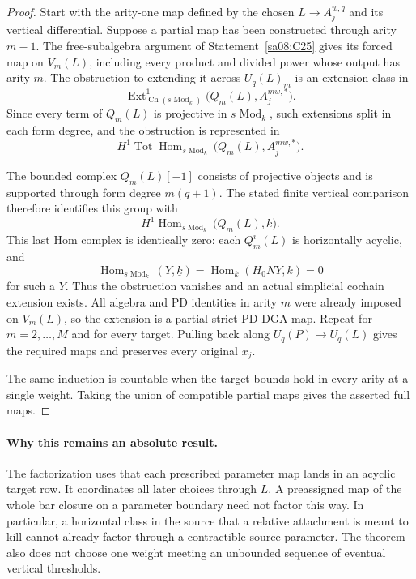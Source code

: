 \begin{proof}
Start with the arity-one map defined by the chosen
$L\to A_j^{w,q}$ and its vertical differential.
Suppose a partial map has been constructed through
arity $m-1$. The free-subalgebra argument of
Statement~\ref{sa08:C25} gives its forced map on
$V_m(L)$, including every product and divided power
whose output has arity $m$. The obstruction to extending
it across $U_q(L)_m$ is an extension class in
\[
 \operatorname{Ext}^1_{\operatorname{Ch}(s\operatorname{Mod}_k)}
       \bigl(Q_m(L),A_j^{mw,*}\bigr).
\]
Since every term of $Q_m(L)$ is projective in
$s\operatorname{Mod}_k$, such extensions split in
each form degree, and the obstruction is represented in
\[
 H^1\operatorname{Tot}\operatorname{Hom}_{s\operatorname{Mod}_k}
       \bigl(Q_m(L),A_j^{mw,*}\bigr).
\]

The bounded complex $Q_m(L)[-1]$ consists of projective
objects and is supported through form degree
$m(q+1)$. The stated finite vertical comparison therefore
identifies this group with
\[
 H^1\operatorname{Hom}_{s\operatorname{Mod}_k}
       \bigl(Q_m(L),\underline{k}\bigr).
\]
This last Hom complex is identically zero: each
$Q_m^i(L)$ is horizontally acyclic, and
\[
 \operatorname{Hom}_{s\operatorname{Mod}_k}
       (Y,\underline{k})
 =\operatorname{Hom}_k(H_0NY,k)=0
\]
for such a $Y$. Thus the obstruction vanishes and an
actual simplicial cochain extension exists. All algebra
and PD identities in arity $m$ were already imposed on
$V_m(L)$, so the extension is a partial strict PD-DGA
map. Repeat for $m=2,\ldots,M$ and for every target.
Pulling back along $U_q(P)\to U_q(L)$ gives the required
maps and preserves every original $x_j$.

The same induction is countable when the target bounds
hold in every arity at a single weight. Taking the union
of compatible partial maps gives the asserted full maps.
\end{proof}

\paragraph{Why this remains an absolute result.}
The factorization uses that each prescribed parameter map
lands in an acyclic target row. It coordinates all later
choices through $L$. A preassigned map of the whole bar
closure on a parameter boundary need not factor this way.
In particular, a horizontal class in the source that a
relative attachment is meant to kill cannot already factor
through a contractible source parameter. The theorem also
does not choose one weight meeting an unbounded sequence
of eventual vertical thresholds.

